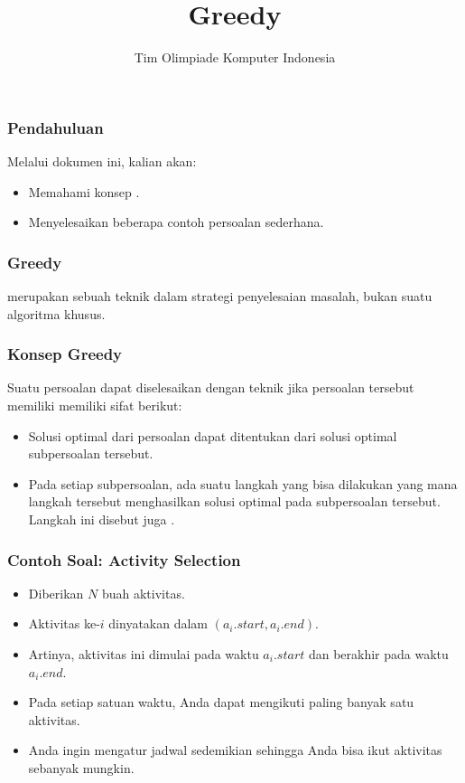  

\title{Greedy}
\author{Tim Olimpiade Komputer Indonesia}
\date{}



\begin{frame}
  \titlepage
\end{frame}

\begin{frame}
  \frametitle{Pendahuluan}
  Melalui dokumen ini, kalian akan:
  \begin{itemize}
    \item Memahami konsep \fgreedy.
    \item Menyelesaikan beberapa contoh persoalan \fgreedy sederhana.
  \end{itemize}
\end{frame}

\begin{frame}
  \frametitle{Greedy}
  \begin{center}
    \fGreedy merupakan sebuah teknik dalam strategi penyelesaian masalah, bukan suatu algoritma khusus.
  \end{center}
\end{frame}

\begin{frame}
  \frametitle{Konsep Greedy}
  Suatu persoalan dapat diselesaikan dengan teknik \fgreedy jika persoalan tersebut memiliki memiliki sifat berikut:
  \begin{itemize}
    \item Solusi optimal dari persoalan dapat ditentukan dari solusi optimal subpersoalan tersebut.
    \item Pada setiap subpersoalan, ada suatu langkah yang bisa dilakukan yang mana langkah tersebut menghasilkan solusi optimal pada subpersoalan tersebut. Langkah ini disebut juga \newTerm{\fgreedyChoice}.
  \end{itemize}
\end{frame}

\begin{frame}
  \frametitle{Contoh Soal: Activity Selection}
  \begin{itemize}
    \item Diberikan $N$ buah aktivitas.
    \item Aktivitas ke-$i$ dinyatakan dalam $(a_i.start, a_i.end)$.
    \item Artinya, aktivitas ini dimulai pada waktu $a_i.start$ dan berakhir pada waktu $a_i.end$.
    \item Pada setiap satuan waktu, Anda dapat mengikuti paling banyak satu aktivitas.
    \item Anda ingin mengatur jadwal sedemikian sehingga Anda bisa ikut aktivitas sebanyak mungkin.
  \end{itemize}
\end{frame}

